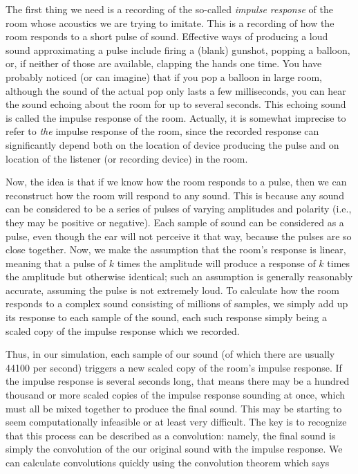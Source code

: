 The first thing we need is a recording of the so-called \emph{impulse response} of the room whose acoustics we are trying to imitate. This is a recording of how the room responds to a short pulse of sound. Effective ways of producing a loud sound approximating a pulse include firing a (blank) gunshot, popping a balloon, or, if neither of those are available, clapping the hands one time. You have probably noticed (or can imagine) that if you pop a balloon in large room, although the sound of the actual pop only lasts a few milliseconds, you can hear the sound echoing about the room for up to several seconds. This echoing sound is called the impulse response of the room. Actually, it is somewhat imprecise to refer to \emph{the} impulse response of the room, since the recorded response can significantly depend both on the location of device producing the pulse and on location of the listener (or recording device) in the room.

Now, the idea is that if we know how the room responds to a pulse, then we can reconstruct how the room will respond to any sound. This is because any sound can be considered to be a series of pulses of varying amplitudes and polarity (i.e., they may be positive or negative). Each sample of sound can be considered as a pulse, even though the ear will not perceive it that way, because the pulses are so close together. Now, we make the assumption that the room's response is linear, meaning that a pulse of $k$ times the amplitude will produce a response of $k$ times the amplitude but otherwise identical; such an assumption is generally reasonably accurate, assuming the pulse is not extremely loud. To calculate how the room responds to a complex sound consisting of millions of samples, we simply add up its response to each sample of the sound, each such response simply being a scaled copy of the impulse response which we recorded.

Thus, in our simulation, each sample of our sound (of which there are usually 44100 per second) triggers a new scaled copy of the room's impulse response. If the impulse response is several seconds long, that means there may be a hundred thousand or more scaled copies of the impulse response sounding at once, which must all be mixed together to produce the final sound. This may be starting to seem computationally infeasible or at least very difficult. The key is to recognize that this process can be described as a convolution: namely, the final sound is simply the convolution of the our original sound with the impulse response. We can calculate convolutions quickly using the convolution theorem which says

